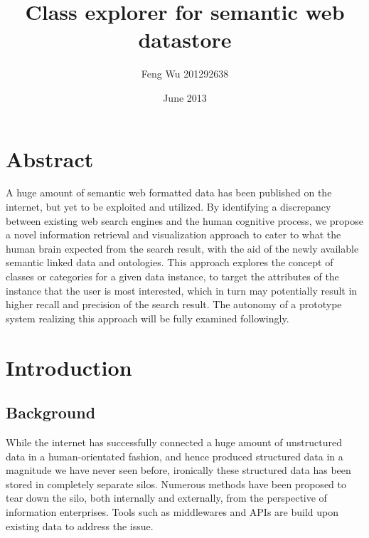 \documentclass[12pt]{cls}
\title{Class explorer for semantic web datastore}
\author{Feng Wu   201292638}
\date{June 2013}
\begin{document}
\muntitlepage

\setcounter{secnumdepth}{3} \setcounter{tocdepth}{1}

 \setcounter{page}{0}

\doublespacing
\setlength{\topmargin}{-.5in}

\chapter*{Abstract}
A huge amount of semantic web formatted data has been published on the internet, but yet to be exploited and utilized. By identifying a discrepancy between existing web search engines and the human cognitive process, we propose a novel information retrieval and visualization approach to cater to what the human brain expected from the search result, with the aid of the newly available semantic linked data and ontologies. This approach explores the concept of classes or categories for a given data instance, to target the attributes of the instance that the user is most interested, which in turn may potentially result in higher recall and precision of the search result. The autonomy of a prototype system realizing this approach will be fully examined followingly.



\renewcommand{\contentsname}{Table of Contents}
\tableofcontents{}

\doublespacing
\clearpage

\chapter{Introduction}
\setcounter{secnumdepth}{3} 
\pagestyle{myheadings}
\markboth{}{}\markright{} \rhead{\thepage} 
\pagestyle{myheadings} \rhead{\thepage}


\section{Background}

While the internet has successfully connected a huge amount of unstructured data in a human-orientated fashion, and hence produced structured data in a magnitude we have never seen before, ironically these structured data has been stored in completely separate silos. Numerous methods have been proposed to tear down the silo, both internally and externally, from the perspective of information enterprises. Tools such as middlewares and APIs are build upon existing data to address the issue.
\end{document}
